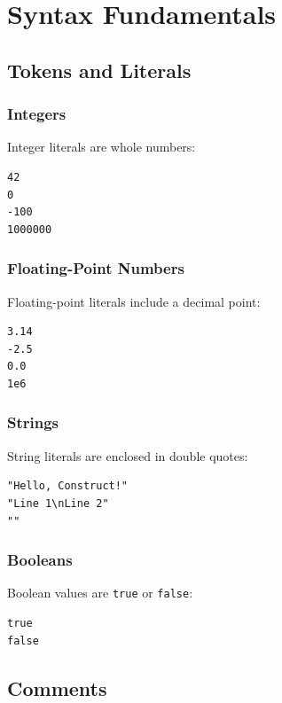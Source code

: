 \documentclass[11pt,twoside,openright]{book}
\begin{document}
\chapter{Syntax Fundamentals}

\section{Tokens and Literals}

\subsection{Integers}

Integer literals are whole numbers:

\begin{lstlisting}[language=ConstructLang]
42
0
-100
1000000
\end{lstlisting}

\subsection{Floating-Point Numbers}

Floating-point literals include a decimal point:

\begin{lstlisting}[language=ConstructLang]
3.14
-2.5
0.0
1e6
\end{lstlisting}

\subsection{Strings}

String literals are enclosed in double quotes:

\begin{lstlisting}[language=ConstructLang]
"Hello, Construct!"
"Line 1\nLine 2"
""
\end{lstlisting}

\subsection{Booleans}

Boolean values are \texttt{true} or \texttt{false}:

\begin{lstlisting}[language=ConstructLang]
true
false
\end{lstlisting}

\section{Comments}
\end{document}
